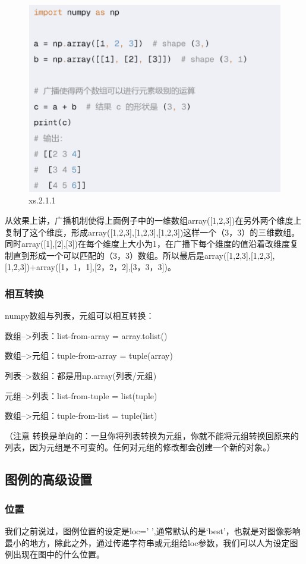 \documentclass[12pt]{article}
\begin{document}
\begin{figure}[H]
    \centering
    \includegraphics[width=0.75\linewidth]{详述 广播机制 program.png}
    \caption{xs.2.1.1}
    \label{fig:enter-label}
\end{figure}
从效果上讲，广播机制使得上面例子中的一维数组array([1,2,3])在另外两个维度上复制了这个维度，形成array([1,2,3],[1,2,3],[1,2,3])这样一个（3，3）的三维数组。同时array([1],[2],[3])在每个维度上大小为1，在广播下每个维度的值沿着改维度复制直到形成一个可以匹配的（3，3）数组。所以最后是array([1,2,3],[1,2,3],[1,2,3])+array([1，1，1],[2，2，2],[3，3，3])。
\subsubsection{相互转换}
numpy数组与列表，元组可以相互转换：

数组-->列表：list-from-array = array.tolist()

数组-->元组：tuple-from-array = tuple(array)

列表-->数组：都是用np.array(列表/元组)

元组-->列表：list-from-tuple = list(tuple)

数组-->元组：tuple-from-list = tuple(list)

（注意 转换是单向的：一旦你将列表转换为元组，你就不能将元组转换回原来的列表，因为元组是不可变的。任何对元组的修改都会创建一个新的对象。）

\subsection{图例的高级设置}\label{图例的高级设置}
\subsubsection{位置}
我们之前说过，图例位置的设定是loc=' ',通常默认的是‘best’，也就是对图像影响最小的地方，除此之外，通过传递字符串或元组给loc参数，我们可以人为设定图例出现在图中的什么位置。
\end{document}
